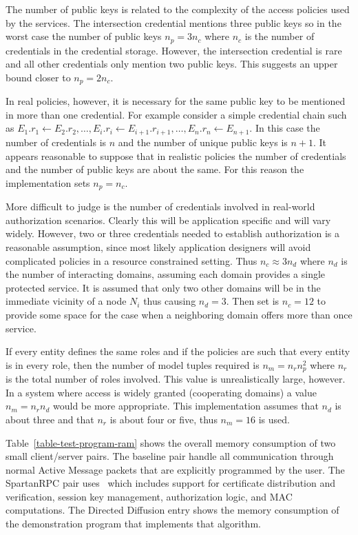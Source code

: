 The number of public keys is related to the complexity of the access policies used by the
services. The intersection credential mentions three public keys so in the worst case the number
of public keys $n_p = 3 n_c$ where $n_c$ is the number of credentials in the credential storage.
However, the intersection credential is rare and all other credentials only mention two public
keys. This suggests an upper bound closer to $n_p = 2 n_c$.

In real policies, however, it is necessary for the same public key to be mentioned in more than
one credential. For example consider a simple credential chain such as $E_1.r_1 \leftarrow
E_2.r_2, \ldots, E_i.r_i \leftarrow E_{i+1}.r_{i+1}, \ldots, E_n.r_n \leftarrow E_{n+1}$. In
this case the number of credentials is $n$ and the number of unique public keys is $n+1$. It
appears reasonable to suppose that in realistic policies the number of credentials and the
number of public keys are about the same. For this reason the implementation sets $n_p = n_c$.

More difficult to judge is the number of credentials involved in real-world authorization
scenarios. Clearly this will be application specific and will vary widely. However, two or three
credentials needed to establish authorization is a reasonable assumption, since most likely
application designers will avoid complicated policies in a resource constrained setting. Thus
$n_c \approx 3 n_d$ where $n_d$ is the number of interacting domains, assuming each domain
provides a single protected service. It is assumed that only two other domains will be in the
immediate vicinity of a node $N_i$ thus causing $n_d = 3$. Then set is $n_c = 12$ to provide
some space for the case when a neighboring domain offers more than once service.

If every entity defines the same roles and if the policies are such that every entity is in
every role, then the number of model tuples required is $n_m = n_r n_p^2$ where $n_r$ is the
total number of roles involved. This value is unrealistically large, however. In a system where
access is widely granted (cooperating domains) a value $n_m = n_r n_d$ would be more
appropriate. This implementation assumes that $n_d$ is about three and that $n_r$ is about four
or five, thus $n_m = 16$ is used.

Table~\ref{table-test-program-ram} shows the overall memory consumption of two small
client/server pairs. The baseline pair handle all communication through normal Active Message
packets that are explicitly programmed by the user. The SpartanRPC pair uses \Sprocket\ which
includes support for certificate distribution and verification, session key management,
authorization logic, and MAC computations. The Directed Diffusion entry shows the memory
consumption of the demonstration program that implements that algorithm.

